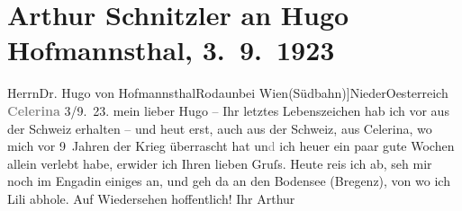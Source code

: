 

         
         \renewcommand{\erwaehntePersonen}{Personen: Hugo von Hofmannsthal, Lili Schnitzler}
         \renewcommand{\erwaehnteOrte}{Orte: Bad Aussee, Bodensee, Bregenz, Celerina, Engadin, Niederösterreich, Rodaun, Schweiz, Südbahnhof, Wien}
         \renewcommand{\erwaehnteWerke}{}
               \section[Arthur Schnitzler an Hugo Hofmannsthal, 3. 9. 1923]{ Arthur Schnitzler an Hugo Hofmannsthal, 3. 9. 1923}\nopagebreak{}\rehead{ }\begin{ledgroupsized}[t]{13cm}\normalsize\beginnumbering \toendnotes[C]{\smallbreak\pagebreak[2]} 
\toendnotes[C]{\smallbreak}\pstart{}{\pb}Herrn\pend{}\pstart{}Dr. Hugo von Hofmannsthal\pend{}\pstart{}Rodaun\pend{}\pstart{}bei Wien\pend{}\pstart{}(Südbahn\oindex{Suedbahnhof@\textbf{Südbahnhof}|pw}{[}){]}\pend{}\pstart{}NiederOesterreich\pend{}{\bigskip}\pstart
           \noindent{}\centering{}\textcolor{gray}{\textbf{{\pb}Celerina}}\pend
           \pstart
           \raggedleft{}{\pb}3/9. 23.\pend
           \pstart
           mein lieber Hugo – Ihr letztes Lebenszeichen hab ich vor \label{K_L02403_1v}\label{K_L02403_1h} aus der Schweiz erhalten – und heut
               erst, auch aus der Schweiz, aus Celerina, wo mich vor 9 Jahren der Krieg überrascht hat
                  un\textcolor{gray}{d} ich \introOben{}heuer\introOben{} ein paar gute Wochen
               allein verlebt habe, {\pb}erwider ich Ihren lieben Gruſs.
               Heute reis ich ab, seh mir noch im Engadin einiges
               an, und geh da{\geminationn} an den Bodensee (Bregenz), von wo ich Lili abhole. Auf Wiedersehen hoffentlich! \pend
           \pstart Ihr \spacefill\mbox{Arthur}\pend{}
         

\end{ledgroupsized}
